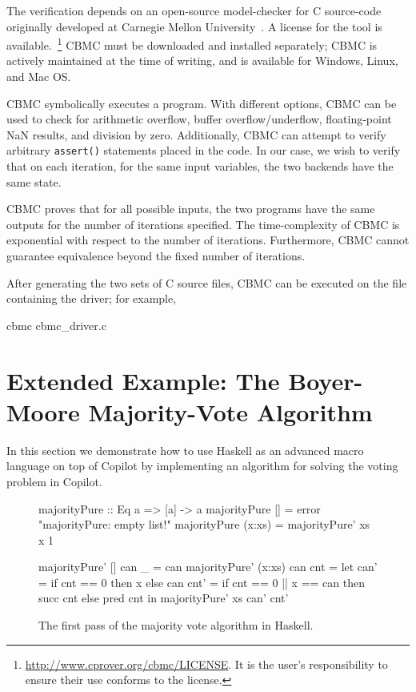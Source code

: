 \documentclass[]{article}
\theoremstyle{example}
\begin{document}
The verification depends on an open-source model-checker for C source-code
originally developed at Carnegie Mellon University~\cite{cbmc}.  A license for
the tool is available.~\footnote{\url{http://www.cprover.org/cbmc/LICENSE}.  It
  is the user's responsibility to ensure their use conforms to the license.}
CBMC must be downloaded and installed separately; CBMC is actively maintained
at the time of writing, and is available for Windows, Linux, and Mac OS.

CBMC symbolically executes a program.  With different options, CBMC can be used
to check for arithmetic overflow, buffer overflow/underflow, floating-point NaN
results, and division by zero.  Additionally, CBMC can attempt to verify
arbitrary {\tt assert()} statements placed in the code.  In our case, we wish to
verify that on each iteration, for the same input variables, the two backends
have the same state.  

CBMC proves that for all possible inputs, the two programs have the same outputs
for the number of iterations specified.  The time-complexity of CBMC is
exponential with respect to the number of iterations.  Furthermore, CBMC cannot
guarantee equivalence beyond the fixed number of iterations.

After generating the two sets of C source files, CBMC can be executed on the
file containing the driver; for example,
%
\begin{code}
cbmc cbmc_driver.c  
\end{code}
%

\section{Extended Example: The Boyer-Moore Majority-Vote Algorithm}
\label{subsec:boyer_moore}

In this section we demonstrate how to use Haskell as an advanced macro language
on top of Copilot by implementing an algorithm for solving the voting problem
in Copilot.

\begin{figure}
\begin{code}
majorityPure :: Eq a => [a] -> a
majorityPure []     = error "majorityPure: empty list!"
majorityPure (x:xs) = majorityPure' xs x 1

majorityPure' []     can _   = can
majorityPure' (x:xs) can cnt =
  let
    can' = if cnt == 0 then x else can
    cnt' = if cnt == 0 || x == can then succ cnt else pred cnt
  in
    majorityPure' xs can' cnt'
\end{code}
\caption{The first pass of the majority vote algorithm in Haskell.}
\label{fig:majority_pure}
\end{figure}
\end{document}

